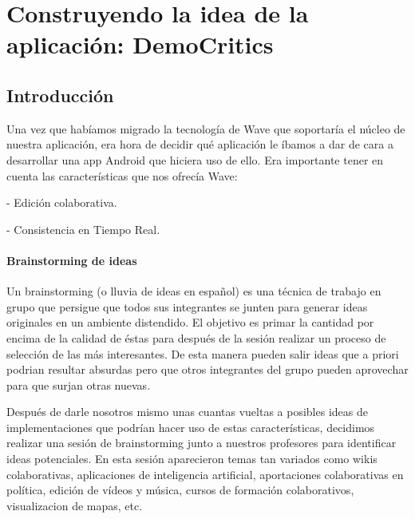 \newpage
\thispagestyle{sectioned}
\chapter{Construyendo la idea de la aplicación: DemoCritics}

\section{Introducción}

Una vez que habíamos migrado la tecnología de Wave que soportaría el núcleo de nuestra aplicación, era hora de decidir qué aplicación le íbamos a dar de cara a desarrollar una app Android que hiciera uso de ello. Era importante tener en cuenta las características que nos ofrecía Wave:

 - Edición colaborativa.

 - Consistencia en Tiempo Real.
 
\subsubsection{Brainstorming de ideas}

Un brainstorming (o lluvia de ideas en español) es una técnica de trabajo en grupo que persigue que todos sus integrantes se junten para generar ideas originales en un ambiente distendido. El objetivo es primar la cantidad por encima de la calidad de éstas para después de la sesión realizar un proceso de selección de las más interesantes. De esta manera pueden salir ideas que a priori podrian resultar absurdas pero que otros integrantes del grupo pueden aprovechar para que surjan otras nuevas.  

Después de darle nosotros mismo unas cuantas vueltas a posibles ideas de implementaciones que podrían hacer uso de estas características, decidimos realizar una sesión de brainstorming junto a nuestros profesores para identificar ideas potenciales. En esta sesión aparecieron temas tan variados como wikis colaborativas, aplicaciones de inteligencia artificial, aportaciones colaborativas en política, edición de vídeos y música, cursos de formación colaborativos, visualizacion de mapas, etc.


